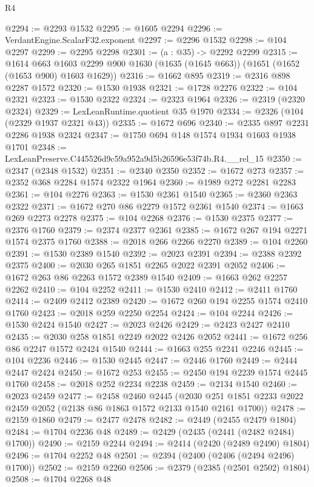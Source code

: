 \begin{lexlean}{R4}
\begin{coremodule}
@2294 := @2293 @1532
@2295 := @1605 @2294
@2296 := VerdantEngine.ScalarF32.exponent
@2297 := @2296 @1532
@2298 := @104 @2297
@2299 := @2295 @2298
@2301 := (a : @35) -> @2292 @2299
@2315 := @1614
    @663
    @1603
    @2299
    @900
    @1630
    (@1635 (@1645 @663))
    (@1651 (@1652 (@1653 @900) @1603 @1629))
@2316 := @1662 @895
@2319 := @2316 @898 @2287 @1572
@2320 := @1530 @1938
@2321 := @1728 @2276
@2322 := @104 @2321
@2323 := @1530 @2322
@2324 := @2323 @1964
@2326 := @2319 (@2320 @2324)
@2329 := LexLeanRuntime.quotient @35 @1970
@2334 := @2326 (@104 (@2329 @1937 @2321 @43))
@2335 := @1672 @696
@2340 := @2335 @897 @2231 @2286 @1938 @2324
@2347 := @1750 @694 @148 @1574 @1934 @1603 @1938 @1701
@2348 := LexLeanPreserve.C445526d9c59a952a9d5b26596e53f74b.R4.__rel_15
@2350 := @2347 (@2348 @1532)
@2351 := @2340 @2350
@2352 := @1672 @273
@2357 := @2352 @368 @2284 @1574 @2322 @1964
@2360 := @1989 @272 @2281 @2283
@2361 := @104 @2276
@2363 := @1530 @2361 @1540
@2365 := @2360 @2363 @2322
@2371 := @1672 @270 @86 @2279 @1572 @2361 @1540
@2374 := @1663 @269 @2273 @2278
@2375 := @104 @2268
@2376 := @1530 @2375
@2377 := @2376 @1760
@2379 := @2374 @2377 @2361
@2385 := @1672 @267 @194 @2271 @1574 @2375 @1760
@2388 := @2018 @266 @2266 @2270
@2389 := @104 @2260
@2391 := @1530 @2389 @1540
@2392 := @2023 @2391
@2394 := @2388 @2392 @2375
@2400 := @2030 @265 @1851 @2265 @2022 @2391 @2052
@2406 := @1672 @263 @86 @2263 @1572 @2389 @1540
@2409 := @1663 @262 @2257 @2262
@2410 := @104 @2252
@2411 := @1530 @2410
@2412 := @2411 @1760
@2414 := @2409 @2412 @2389
@2420 := @1672 @260 @194 @2255 @1574 @2410 @1760
@2423 := @2018 @259 @2250 @2254
@2424 := @104 @2244
@2426 := @1530 @2424 @1540
@2427 := @2023 @2426
@2429 := @2423 @2427 @2410
@2435 := @2030 @258 @1851 @2249 @2022 @2426 @2052
@2441 := @1672 @256 @86 @2247 @1572 @2424 @1540
@2444 := @1663 @255 @2241 @2246
@2445 := @104 @2236
@2446 := @1530 @2445
@2447 := @2446 @1760
@2449 := @2444 @2447 @2424
@2450 := @1672 @253
@2455 := @2450 @194 @2239 @1574 @2445 @1760
@2458 := @2018 @252 @2234 @2238
@2459 := @2134 @1540
@2460 := @2023 @2459
@2477 := @2458
    @2460
    @2445
    (@2030 @251 @1851 @2233 @2022 @2459 @2052 (@2138 @86 @1863 @1572 @2133 @1540 @2161 @1700))
@2478 := @2159 @1860
@2479 := @2477 @2478
@2482 := @2449 (@2455 @2479 @1804)
@2484 := @1704 @2236 @48
@2489 := @2429 (@2435 (@2441 (@2482 @2484) @1700))
@2490 := @2159 @2244
@2494 := @2414 (@2420 (@2489 @2490) @1804)
@2496 := @1704 @2252 @48
@2501 := @2394 (@2400 (@2406 (@2494 @2496) @1700))
@2502 := @2159 @2260
@2506 := @2379 (@2385 (@2501 @2502) @1804)
@2508 := @1704 @2268 @48

\end{coremodule}
\end{lexlean}
